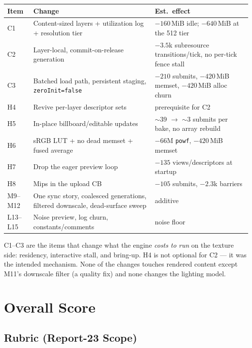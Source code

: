 \documentclass[11pt,a4paper]{article}
\begin{document}
\begin{table}[h]
\centering
\small
\begin{tabular}{@{}lp{5.8cm}p{5.6cm}@{}}
\toprule
\textbf{Item} & \textbf{Change} & \textbf{Est.\ effect} \\
\midrule
C1 & Content-sized layers + utilization log + resolution tier & $-160$\,MiB idle; $-640$\,MiB at the 512 tier \\
C2 & Layer-local, commit-on-release generation & $-3.5$k subresource transitions/tick, no per-tick fence stall \\
C3 & Batched load path, persistent staging, \texttt{zeroInit=false} & $-210$ submits, $-420$\,MiB memset, $-420$\,MiB alloc churn \\
H4 & Revive per-layer descriptor sets & prerequisite for C2 \\
H5 & In-place billboard/editable updates & $\sim$39 $\rightarrow$ $\sim$3 submits per bake, no array rebuild \\
H6 & sRGB LUT + no dead memset + fused average & $-66$M \texttt{powf}, $-420$\,MiB memset \\
H7 & Drop the eager preview loop & $-135$ views/descriptors at startup \\
H8 & Mips in the upload CB & $-105$ submits, $-2.3$k barriers \\
M9--M12 & One sync story, coalesced generations, filtered downscale, dead-surface sweep & additive \\
L13--L15 & Noise preview, log churn, constants/comments & noise floor \\
\bottomrule
\end{tabular}
\end{table}

C1--C3 are the items that change what the engine \emph{costs to run} on the
texture side: residency, interactive stall, and bring-up. H4 is not optional
for C2 --- it was the intended mechanism. None of the changes touches rendered
content except M11's downscale filter (a quality fix) and none changes the
lighting model.

\section{Overall Score}
\label{sec:score23}

\subsection{Rubric (Report-23 Scope)}
\end{document}
